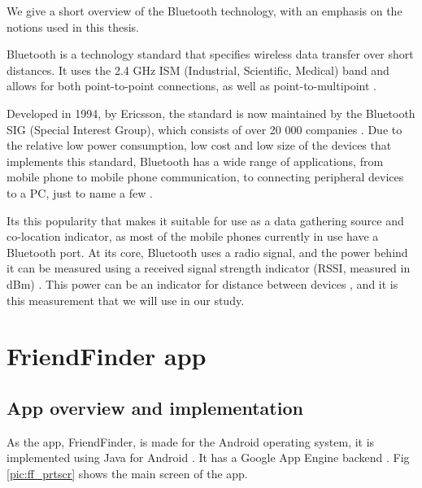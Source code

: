 We give a short overview of the Bluetooth technology, with an emphasis on the notions used in this thesis.    

Bluetooth is a technology standard that specifies wireless data transfer over short distances. It uses the 2.4 GHz ISM (Industrial, Scientific, Medical) band and allows for both point-to-point connections, as well as point-to-multipoint \cite{bluet}. 

Developed in 1994, by Ericsson, the standard is now maintained by the Bluetooth SIG (Special Interest Group), which consists of over 20 000 companies \cite{bloae}. Due to the relative low power consumption, low cost and low size of the devices that implements this standard, Bluetooth has a wide range of applications, from mobile phone to mobile phone communication, to connecting peripheral devices to a PC, just to name a few \cite{bluet}.

Its this popularity that makes it suitable for use as a data gathering source and co-location indicator, as most of the mobile phones currently in use have a Bluetooth port. At its core, Bluetooth uses a radio signal, and the power behind it can be measured using a received signal strength indicator (RSSI, measured in dBm) \cite{sauter2010gsm}. This power can be an indicator for distance between devices \cite{vedran}, and it is this measurement that we will use in our study.  

\section{FriendFinder app}

\subsection{App overview and implementation}

As the app, FriendFinder, is made for the Android operating system, it is implemented using Java for Android \cite{jandroid}. It has a Google App Engine backend \cite{googleapp}. Fig \ref{pic:ff_prtscr} shows the main screen of the app. 

